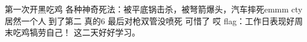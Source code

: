 第一次开黑吃鸡
各种神奇死法：被平底锅击杀，被弩箭爆头，汽车摔死emmm
cty居然一个人🐶到了第二 真的6 最后对枪双管没喷死 可惜了 哎
flag：工作日表现好周末吃鸡犒劳自己！
这二天好好学习。
